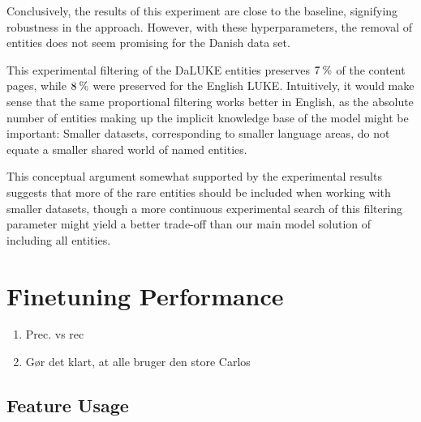 \documentclass[main.tex]{subfiles}
\begin{document}


Conclusively, the results of this experiment are close to the baseline, signifying robustness in the approach.
However, with these hyperparameters, the removal of entities does not seem promising for the Danish data set.

This experimental filtering of the DaLUKE entities preserves $7\:\text{\%{}}$ of the content pages, while $8\:\text{\%{}}$ were preserved for the English LUKE.
Intuitively, it would make sense that the same proportional filtering works better in English, as the absolute number of entities making up the implicit knowledge base of the model might be important:
Smaller datasets, corresponding to smaller language areas, do not equate a smaller shared world of named entities.

This conceptual argument somewhat supported by the experimental results suggests that more of the rare entities should be included when working with smaller datasets, though a more continuous experimental search of this filtering parameter might yield a better trade-off than our main model solution of including all entities.

\section{Finetuning Performance}
\label{sec:finetuning-exp}
\begin{enumerate}
    \item Prec. vs rec
    \item Gør det klart, at alle bruger den store Carlos
\end{enumerate}

\subsection{Feature Usage}%
\label{sub:Feature Usage}
\end{document}

